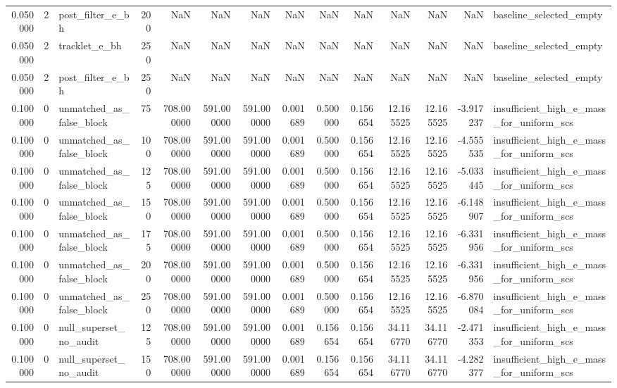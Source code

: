 \begin{tabular}{rrlrrrrrrrrrrl}
0.050000 & 2 & post_filter_e_bh & 200 & NaN & NaN & NaN & NaN & NaN & NaN & NaN & NaN & NaN & baseline_selected_empty \\
0.050000 & 2 & tracklet_e_bh & 250 & NaN & NaN & NaN & NaN & NaN & NaN & NaN & NaN & NaN & baseline_selected_empty \\
0.050000 & 2 & post_filter_e_bh & 250 & NaN & NaN & NaN & NaN & NaN & NaN & NaN & NaN & NaN & baseline_selected_empty \\
0.100000 & 0 & unmatched_as_false_block & 75 & 708.000000 & 591.000000 & 591.000000 & 0.001689 & 0.500000 & 0.156654 & 12.165525 & 12.165525 & -3.917237 & insufficient_high_e_mass_for_uniform_scs \\
0.100000 & 0 & unmatched_as_false_block & 100 & 708.000000 & 591.000000 & 591.000000 & 0.001689 & 0.500000 & 0.156654 & 12.165525 & 12.165525 & -4.555535 & insufficient_high_e_mass_for_uniform_scs \\
0.100000 & 0 & unmatched_as_false_block & 125 & 708.000000 & 591.000000 & 591.000000 & 0.001689 & 0.500000 & 0.156654 & 12.165525 & 12.165525 & -5.033445 & insufficient_high_e_mass_for_uniform_scs \\
0.100000 & 0 & unmatched_as_false_block & 150 & 708.000000 & 591.000000 & 591.000000 & 0.001689 & 0.500000 & 0.156654 & 12.165525 & 12.165525 & -6.148907 & insufficient_high_e_mass_for_uniform_scs \\
0.100000 & 0 & unmatched_as_false_block & 175 & 708.000000 & 591.000000 & 591.000000 & 0.001689 & 0.500000 & 0.156654 & 12.165525 & 12.165525 & -6.331956 & insufficient_high_e_mass_for_uniform_scs \\
0.100000 & 0 & unmatched_as_false_block & 200 & 708.000000 & 591.000000 & 591.000000 & 0.001689 & 0.500000 & 0.156654 & 12.165525 & 12.165525 & -6.331956 & insufficient_high_e_mass_for_uniform_scs \\
0.100000 & 0 & unmatched_as_false_block & 250 & 708.000000 & 591.000000 & 591.000000 & 0.001689 & 0.500000 & 0.156654 & 12.165525 & 12.165525 & -6.870084 & insufficient_high_e_mass_for_uniform_scs \\
0.100000 & 0 & null_superset_no_audit & 125 & 708.000000 & 591.000000 & 591.000000 & 0.001689 & 0.156654 & 0.156654 & 34.116770 & 34.116770 & -2.471353 & insufficient_high_e_mass_for_uniform_scs \\
0.100000 & 0 & null_superset_no_audit & 150 & 708.000000 & 591.000000 & 591.000000 & 0.001689 & 0.156654 & 0.156654 & 34.116770 & 34.116770 & -4.282377 & insufficient_high_e_mass_for_uniform_scs \\

\end{tabular}
